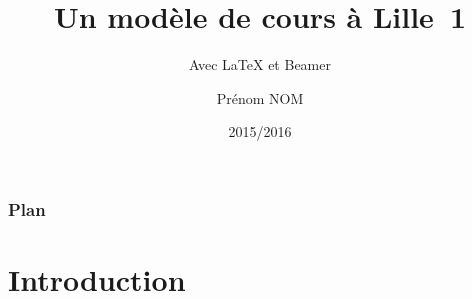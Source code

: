 \documentclass[10pt,t]{beamer}
\title{Un modèle de cours à Lille~1}
\subtitle{Avec \LaTeX{} et Beamer}
\author{Prénom NOM}
\institute{Université Lille~1 \and IUT «A»}
\date{2015/2016}
\begin{document}
\maketitle[label=titre]

\begin{frame}
  \frametitle{Plan}
  \tableofcontents %
\end{frame}


\section*{Introduction}

\end{document}
